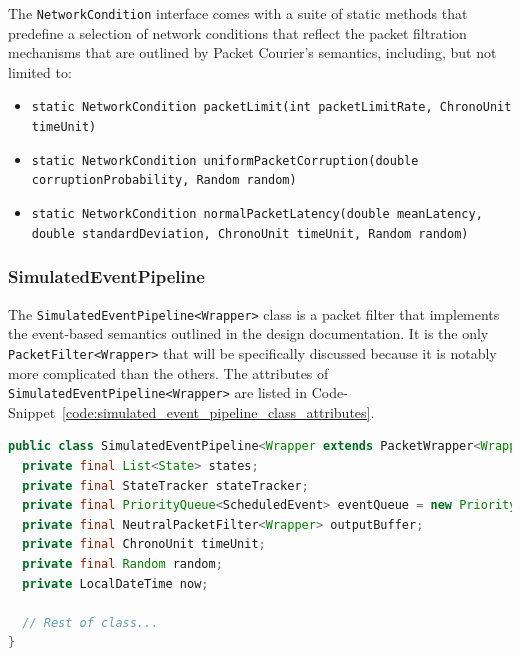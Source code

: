 The \texttt{NetworkCondition} interface comes with a suite of static methods that predefine a selection of network
conditions that reflect the packet filtration mechanisms that are outlined by Packet Courier's semantics, including,
but not limited to:
\begin{itemize}
    \item \texttt{static NetworkCondition packetLimit(int packetLimitRate, ChronoUnit timeUnit)}
    \item \texttt{static NetworkCondition uniformPacketCorruption(double corruptionProbability, Random random)}
    \item \texttt{static NetworkCondition normalPacketLatency(double meanLatency, double standardDeviation,
        ChronoUnit timeUnit, Random random)}
\end{itemize}

\subsubsection{SimulatedEventPipeline}\label{subsubsection:simulated_event_pipeline}

The \texttt{SimulatedEventPipeline<Wrapper>} class is a packet filter that implements the event-based semantics
outlined in the design documentation. It is the only \texttt{PacketFilter<Wrapper>} that will be specifically
discussed because it is notably more complicated than the others. The attributes of
\texttt{SimulatedEventPipeline<Wrapper>} are listed in
Code-Snippet~\ref{code:simulated_event_pipeline_class_attributes}.
\begin{lstlisting}[language=Java,caption={The attributes of the \texttt{SimulatedEventPipeline<Wrapper>} class.},
    label={code:simulated_event_pipeline_class_attributes},captionpos=b]
public class SimulatedEventPipeline<Wrapper extends PacketWrapper<Wrapper>> implements PacketFilter<Wrapper> {
  private final List<State> states;
  private final StateTracker stateTracker;
  private final PriorityQueue<ScheduledEvent> eventQueue = new PriorityQueue<>();
  private final NeutralPacketFilter<Wrapper> outputBuffer;
  private final ChronoUnit timeUnit;
  private final Random random;
  private LocalDateTime now;

  // Rest of class...
}
\end{lstlisting}

